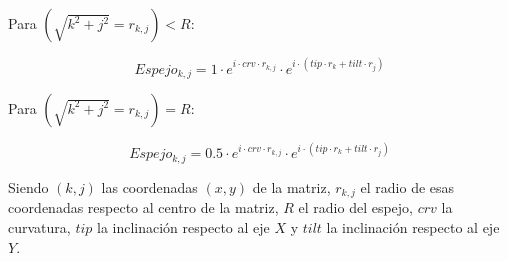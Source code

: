 \documentclass[twoside]{article}
\begin{document}
					Para  $(\sqrt{k^2+j^2}=r_{k,j}) < R$:

						\begin{equation}
							Espejo_{k, j} = 1 \cdot e^{i\cdot crv \cdot r_{k,j}} \cdot e^{i\cdot (tip\cdot r_k + tilt \cdot r_j)}
						\end{equation}
						
					Para $(\sqrt{k^2+j^2}=r_{k,j}) = R$:

						\begin{equation}
							Espejo_{k,j} = 0.5 \cdot e^{i\cdot crv \cdot r_{k,j}} \cdot e^{i\cdot (tip\cdot r_k + tilt \cdot r_j)}
							\label{eq:Espejo}
						\end{equation}	

					Siendo $(k, j)$ las coordenadas $(x, y)$ de la matriz, $r_{k, j}$ el radio de esas coordenadas respecto al centro de la matriz, $R$ el radio del espejo, $crv$ la curvatura, $tip$ la inclinación respecto al eje $X$ y $tilt$ la inclinación respecto al eje $Y$.
		    		

		
		

	
\end{document}
